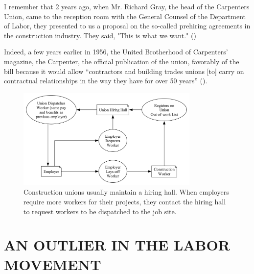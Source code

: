 \documentclass[12pt]{article}
\newcommand{\imageWidth}{0.8\textwidth}
\renewenvironment{quote}
  {\list{}{\leftmargin=\parindent\rightmargin=0pt}%
   \item\relax}
  {\endlist}
\begin{document}
\begin{quote}
I remember that 2 years ago, when Mr. Richard Gray, the head of the Carpenters Union, came to the reception room with the General Counsel of the Department of Labor, they presented to us a proposal on the so-called prehiring agreements in the construction industry. They said, "This is what we want." (\cite[6414]{105CongressionalRecord1959})
\end{quote}

\noindent
Indeed, a few years earlier in 1956, the United Brotherhood of Carpenters’ magazine, the Carpenter, the official publication of the union, favorably of the bill because it would allow “contractors and building trades unions [to] carry on contractual relationships in the way they have for over 50 years” (\cite[7--8]{ubcActionTalksSay1956}).

\begin{figure}[ht]
  \centering
  \includegraphics[width=\imageWidth]{images/hiring_hall}
  \captionsetup{justification=centering, singlelinecheck=false, margin=2cm} 
  \caption[Union Hiring Hall]{Construction unions usually maintain a hiring hall. When employers require more workers for their projects, they contact the hiring hall to request workers to be dispatched to the job site.}
  \label{fig:hiring_hall}
\end{figure}

\section{AN OUTLIER IN THE LABOR MOVEMENT}\
\end{document}
